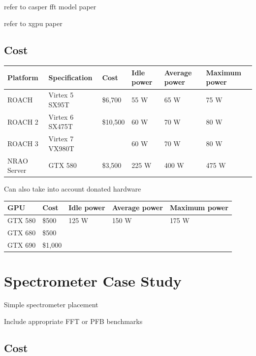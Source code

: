 refer to casper fft model paper

refer to xgpu paper

\subsection{Cost}

\begin{table}
\begin{tabular}{| l | l | l | l | l | l |}
\hline  
\textbf{Platform} & Specification & Cost & Idle power & Average power & Maximum power \\
\hline  
ROACH & Virtex 5 SX95T & \$6,700 & 55 W & 65 W & 75 W \\
ROACH 2 & Virtex 6 SX475T & \$10,500 & 60 W & 70 W & 80 W \\
ROACH 3 & Virtex 7 VX980T & & 60 W & 70 W & 80 W \\
NRAO Server & GTX 580 & \$3,500 & 225 W & 400 W & 475 W \\
\hline  
\end{tabular}
\end{table} 

Can also take into account donated hardware \\

\begin{table}
\begin{tabular}{| l | l | l | l | l |}
\hline  
GPU & Cost & Idle power & Average power & Maximum power \\
\hline  
GTX 580& \$500 & 125 W & 150 W & 175 W \\
GTX 680 & \$500 & & & \\
GTX 690& \$1,000 & & & \\
\hline  
\end{tabular}
\end{table} 



\section{Spectrometer Case Study}
Simple spectrometer placement

Include appropriate FFT or PFB benchmarks
\subsection{Cost}
